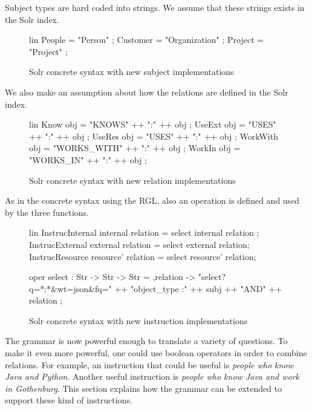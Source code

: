 Subject types are hard coded into strings. We assume that these strings exists in the Solr index.

\begin{figure}[H]
\begin{code}
lin
  People = "Person" ;
  Customer = "Organization" ;
  Project = "Project" ;
\end{code}
\caption{Solr concrete syntax with new subject implementations\label{fig:solr-function-implementation}}
\end{figure}

We also make an assumption about how the relations are defined in the Solr index. 

\begin{figure}[H]
\begin{code}
lin
  Know obj = "KNOWS" ++ ":" ++ obj ;
  UseExt obj = "USES" ++ ":" ++ obj ;
  UseRes obj = "USES" ++ ":" ++ obj ;
  WorkWith obj = "WORKS_WITH" ++ ":" ++ obj ;
  WorkIn obj = "WORKS_IN" ++ ":" ++ obj ;
\end{code}
\caption{Solr concrete syntax with new relation implementations\label{fig:solr-new-relations}}
\end{figure}

As in the concrete syntax using the RGL, also an operation is defined and used by the three functions.

\begin{figure}[H]
\begin{code}
lin
  InstrucInternal internal relation = select internal relation ;
  InstrucExternal external relation = select external relation;
  InstrucResource resource' relation = select resource' relation;

oper
  select : Str -> Str -> Str = \subj,relation -> 
                    "select?q=*:*&wt=json&fq=" ++ "object_type :" 
                    ++ subj ++ "AND" ++ relation ;
\end{code}
\caption{Solr concrete syntax with new instruction implementations\label{fig:solr-new-instructions}}
\end{figure}

The grammar is now powerful enough to translate a variety of questions. To make it even more powerful, one could use boolean operators in order to combine relations. For example, an instruction that could be useful is \emph{people who know Java and Python}. Another useful instruction is \emph{people who know Java and work in Gothenburg}. This section explains how the grammar can be extended to support these kind of instructions.

